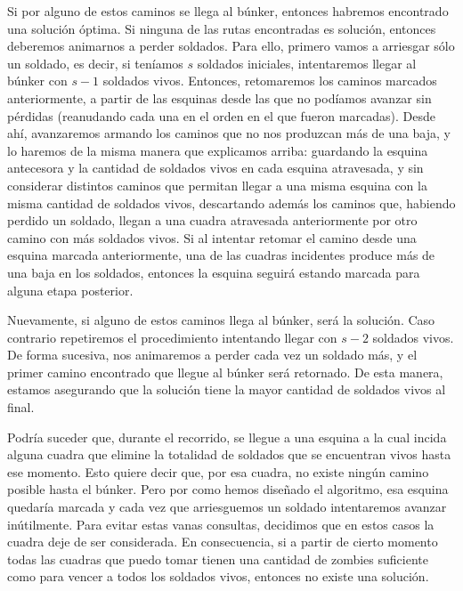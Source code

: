 Si por alguno de estos caminos se llega al búnker, entonces habremos encontrado una solución óptima.  Si ninguna de las rutas encontradas es solución, entonces deberemos animarnos a perder soldados.  Para ello, primero vamos a arriesgar sólo un soldado, es decir, si teníamos $s$ soldados iniciales, intentaremos llegar al búnker con $s-1$ soldados vivos. Entonces, retomaremos los caminos marcados anteriormente, a partir de las esquinas desde las que no podíamos avanzar sin pérdidas (reanudando cada una en el orden en el que fueron marcadas).  Desde ahí, avanzaremos armando los caminos que no nos produzcan más de una baja, y lo haremos de la misma manera que explicamos arriba: guardando la esquina antecesora y la cantidad de soldados vivos en cada esquina atravesada, y sin considerar distintos caminos que permitan llegar a una misma esquina con la misma cantidad de soldados vivos, descartando además los caminos que, habiendo perdido un soldado, llegan a una cuadra atravesada anteriormente por otro camino con más soldados vivos. Si al intentar retomar el camino desde una esquina marcada anteriormente, una de las cuadras incidentes produce más de una baja en los soldados, entonces la esquina seguirá estando marcada para alguna etapa posterior.

Nuevamente, si alguno de estos caminos llega al búnker, será la solución.  Caso contrario repetiremos el procedimiento intentando llegar con $s-2$ soldados vivos. De forma sucesiva, nos animaremos a perder cada vez un soldado más, y el primer camino encontrado que llegue al búnker será retornado.  De esta manera, estamos asegurando que la solución tiene la mayor cantidad de soldados vivos al final.

Podría suceder que, durante el recorrido, se llegue a una esquina a la cual incida alguna cuadra que elimine la totalidad de soldados que se encuentran vivos hasta ese momento.  Esto quiere decir que, por esa cuadra, no existe ningún camino posible hasta el búnker. Pero por como hemos diseñado el algoritmo, esa esquina quedaría marcada y cada vez que arriesguemos un soldado intentaremos avanzar inútilmente.  Para evitar estas vanas consultas, decidimos que en estos casos la cuadra deje de ser considerada. En consecuencia, si a partir de cierto momento todas las cuadras que puedo tomar tienen una cantidad de zombies suficiente como para vencer a todos los soldados vivos, entonces no existe una solución.

